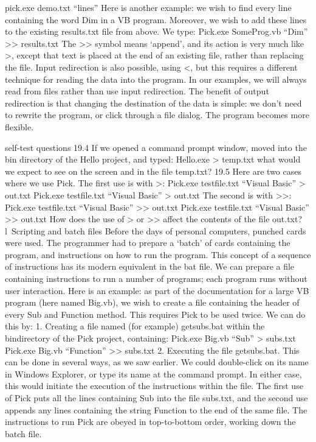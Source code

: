 pick.exe demo.txt “lines”
Here is another example: we wish to ﬁnd every line containing the word Dim in a VB program. Moreover, we wish to add these lines to the existing results.txt ﬁle from above. We type:
Pick.exe SomeProg.vb “Dim” >> results.txt
The >> symbol means ‘append’, and its action is very much like >, except that text is placed at the end of an existing ﬁle, rather than replacing the ﬁle.
Input redirection is also possible, using <, but this requires a different technique for reading the data into the program. In our examples, we will always read from ﬁles rather than use input redirection.
The beneﬁt of output redirection is that changing the destination of the data is
simple: we don’t need to rewrite the program, or click through a ﬁle dialog. The program becomes more ﬂexible.

self-test questions
19.4	If we opened a command prompt window, moved into the bin directory of the Hello project, and typed:
Hello.exe > temp.txt
	what would we expect to see on the screen and in the ﬁle temp.txt?
19.5	Here are two cases where we use Pick. The ﬁrst use is with >:
Pick.exe testfile.txt “Visual Basic” > out.txt
Pick.exe testfile.txt “Visual Basic” > out.txt
	The second is with >>:
Pick.exe testfile.txt “Visual Basic” >> out.txt
Pick.exe testfile.txt “Visual Basic” >> out.txt
	How does the use of > or >> affect the contents of the ﬁle out.txt?
l Scripting and batch ﬁles
Before the days of personal computers, punched cards were used. The programmer had to prepare a ‘batch’ of cards containing the program, and instructions on how to run the program. This concept of a sequence of instructions has its modern equivalent in the bat ﬁle. We can prepare a ﬁle containing instructions to run a number of programs; each program runs without user interaction.
Here is an example: as part of the documentation for a large VB program (here named Big.vb), we wish to create a ﬁle containing the header of every Sub and Function method. This requires Pick to be used twice. We can do this by:
1.	Creating a ﬁle named (for example) getsubs.bat within the bin\Debug directory of the Pick project, containing:
Pick.exe Big.vb “Sub” > subs.txt
Pick.exe Big.vb “Function” >> subs.txt
2.	Executing the ﬁle getsubs.bat. This can be done in several ways, as we saw earlier. We could double-click on its name in Windows Explorer, or type its name at the command prompt. In either case, this would initiate the execution of the instructions within the ﬁle.
The ﬁrst use of Pick puts all the lines containing Sub into the ﬁle subs.txt, and the second use appends any lines containing the string Function to the end of the same ﬁle. The instructions to run Pick are obeyed in top-to-bottom order, working down the batch ﬁle.

